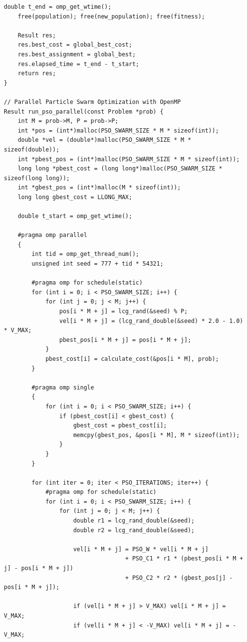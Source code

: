 \documentclass[12pt]{article}
\begin{document}
\begin{lstlisting}[style=code]
    double t_end = omp_get_wtime();
    free(population); free(new_population); free(fitness);

    Result res;
    res.best_cost = global_best_cost;
    res.best_assignment = global_best;
    res.elapsed_time = t_end - t_start;
    return res;
}

// Parallel Particle Swarm Optimization with OpenMP
Result run_pso_parallel(const Problem *prob) {
    int M = prob->M, P = prob->P;
    int *pos = (int*)malloc(PSO_SWARM_SIZE * M * sizeof(int));
    double *vel = (double*)malloc(PSO_SWARM_SIZE * M * sizeof(double));
    int *pbest_pos = (int*)malloc(PSO_SWARM_SIZE * M * sizeof(int));
    long long *pbest_cost = (long long*)malloc(PSO_SWARM_SIZE * sizeof(long long));
    int *gbest_pos = (int*)malloc(M * sizeof(int));
    long long gbest_cost = LLONG_MAX;

    double t_start = omp_get_wtime();

    #pragma omp parallel
    {
        int tid = omp_get_thread_num();
        unsigned int seed = 777 + tid * 54321;

        #pragma omp for schedule(static)
        for (int i = 0; i < PSO_SWARM_SIZE; i++) {
            for (int j = 0; j < M; j++) {
                pos[i * M + j] = lcg_rand(&seed) % P;
                vel[i * M + j] = (lcg_rand_double(&seed) * 2.0 - 1.0) * V_MAX;
                pbest_pos[i * M + j] = pos[i * M + j];
            }
            pbest_cost[i] = calculate_cost(&pos[i * M], prob);
        }

        #pragma omp single
        {
            for (int i = 0; i < PSO_SWARM_SIZE; i++) {
                if (pbest_cost[i] < gbest_cost) {
                    gbest_cost = pbest_cost[i];
                    memcpy(gbest_pos, &pos[i * M], M * sizeof(int));
                }
            }
        }

        for (int iter = 0; iter < PSO_ITERATIONS; iter++) {
            #pragma omp for schedule(static)
            for (int i = 0; i < PSO_SWARM_SIZE; i++) {
                for (int j = 0; j < M; j++) {
                    double r1 = lcg_rand_double(&seed);
                    double r2 = lcg_rand_double(&seed);

                    vel[i * M + j] = PSO_W * vel[i * M + j]
                                   + PSO_C1 * r1 * (pbest_pos[i * M + j] - pos[i * M + j])
                                   + PSO_C2 * r2 * (gbest_pos[j] - pos[i * M + j]);

                    if (vel[i * M + j] > V_MAX) vel[i * M + j] = V_MAX;
                    if (vel[i * M + j] < -V_MAX) vel[i * M + j] = -V_MAX;


\end{lstlisting}
\end{document}
